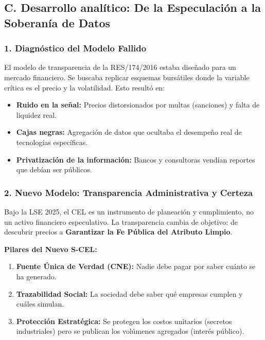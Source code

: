 \documentclass{cel}
\begin{document}
\subsection{C. Desarrollo analítico: De la Especulación a la Soberanía de Datos}
\nopagebreak

\subsubsection{1. Diagnóstico del Modelo Fallido}
\nopagebreak

El modelo de transparencia de la RES/174/2016 estaba diseñado para un \textquotedbl{}mercado financiero\textquotedbl{}. Se buscaba replicar esquemas bursátiles donde la variable crítica es el precio y la volatilidad. Esto resultó en:


\begin{itemize}
\item \textbf{Ruido en la señal:} Precios distorsionados por multas (sanciones) y falta de liquidez real.
\item \textbf{Cajas negras:} Agregación de datos que ocultaba el desempeño real de tecnologías específicas.
\item \textbf{Privatización de la información:} Bancos y consultoras vendían reportes que debían ser públicos.

\end{itemize}
\subsubsection{2. Nuevo Modelo: Transparencia Administrativa y Certeza}
\nopagebreak

Bajo la LSE 2025, el CEL es un instrumento de planeación y cumplimiento, no un activo financiero especulativo. La transparencia cambia de objetivo: de \textquotedbl{}descubrir precios\textquotedbl{} a \textbf{\textquotedbl{}Garantizar la Fe Pública del Atributo Limpio\textquotedbl{}}.


\textbf{Pilares del Nuevo S-CEL:}


\begin{enumerate}
\item \textbf{Fuente Única de Verdad (CNE):} Nadie debe pagar por saber cuánto se ha generado.
\item \textbf{Trazabilidad Social:} La sociedad debe saber qué empresas cumplen y cuáles simulan.
\item \textbf{Protección Estratégica:} Se protegen los costos unitarios (secretos industriales) pero se publican los volúmenes agregados (interés público).

\end{enumerate}
\vspace{0.4cm}
\end{document}
